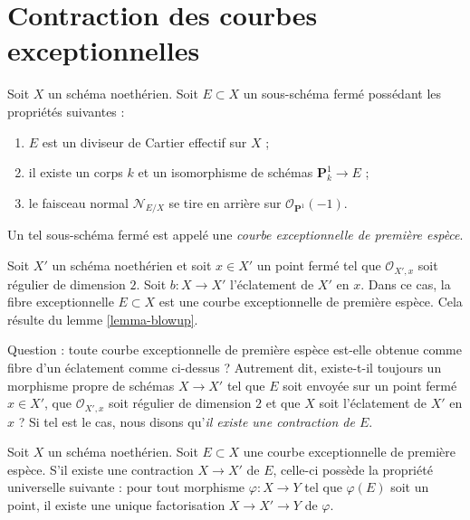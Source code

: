 \section{Contraction des courbes exceptionnelles} \label{section-minus-one}

\noindent Soit $X$ un schéma noethérien. Soit $E \subset X$ un sous-schéma fermé possédant les propriétés suivantes : \begin{enumerate} \item $E$ est un diviseur de Cartier effectif sur $X$ ; \item il existe un corps $k$ et un isomorphisme de schémas $\mathbf{P}^1_k \to E$ ; \item le faisceau normal $\mathcal{N}_{E/X}$ se tire en arrière sur $\mathcal{O}_{\mathbf{P}^1}(-1)$. \end{enumerate} Un tel sous-schéma fermé est appelé une {\it courbe exceptionnelle de première espèce}.

\medskip\noindent Soit $X'$ un schéma noethérien et soit $x \in X'$ un point fermé tel que $\mathcal{O}_{X', x}$ soit régulier de dimension $2$. Soit $b : X \to X'$ l'éclatement de $X'$ en $x$. Dans ce cas, la fibre exceptionnelle $E \subset X$ est une courbe exceptionnelle de première espèce. Cela résulte du lemme \ref{lemma-blowup}.

\medskip\noindent Question : toute courbe exceptionnelle de première espèce est-elle obtenue comme fibre d'un éclatement comme ci-dessus ? Autrement dit, existe-t-il toujours un morphisme propre de schémas $X \to X'$ tel que $E$ soit envoyée sur un point fermé $x \in X'$, que $\mathcal{O}_{X', x}$ soit régulier de dimension $2$ et que $X$ soit l'éclatement de $X'$ en $x$ ? Si tel est le cas, nous disons qu'{\it il existe une contraction de $E$}.

\begin{lemma} \label{lemma-factor-through-contraction} Soit $X$ un schéma noethérien. Soit $E \subset X$ une courbe exceptionnelle de première espèce. S'il existe une contraction $X \to X'$ de $E$, celle-ci possède la propriété universelle suivante : pour tout morphisme $\varphi : X \to Y$ tel que $\varphi(E)$ soit un point, il existe une unique factorisation $X \to X' \to Y$ de $\varphi$. \end{lemma}

